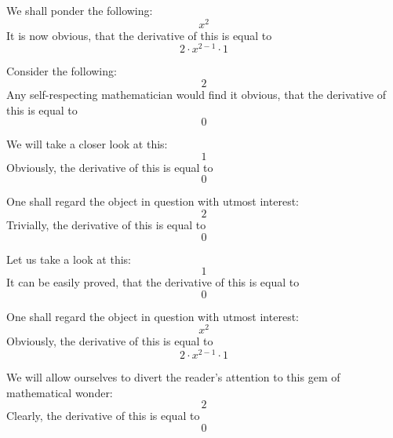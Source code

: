 \documentclass{article}
\begin{document}
We shall ponder the following:
\begin{equation}
x ^{2 } 
\end{equation}
It is now obvious, that the derivative of this is equal to
\begin{equation}
2 \cdot x ^{2 - 1 } \cdot 1 
\end{equation}

Consider the following:
\begin{equation}
2 
\end{equation}
Any self-respecting mathematician would find it obvious, that the derivative of this is equal to
\begin{equation}
0 
\end{equation}

We will take a closer look at this:
\begin{equation}
1 
\end{equation}
Obviously, the derivative of this is equal to
\begin{equation}
0 
\end{equation}

One shall regard the object in question with utmost interest:
\begin{equation}
2 
\end{equation}
Trivially, the derivative of this is equal to
\begin{equation}
0 
\end{equation}

Let us take a look at this:
\begin{equation}
1 
\end{equation}
It can be easily proved, that the derivative of this is equal to
\begin{equation}
0 
\end{equation}

One shall regard the object in question with utmost interest:
\begin{equation}
x ^{2 } 
\end{equation}
Obviously, the derivative of this is equal to
\begin{equation}
2 \cdot x ^{2 - 1 } \cdot 1 
\end{equation}

We will allow ourselves to divert the reader's attention to this gem of mathematical wonder:
\begin{equation}
2 
\end{equation}
Clearly, the derivative of this is equal to
\begin{equation}
0 
\end{equation}
\end{document}
